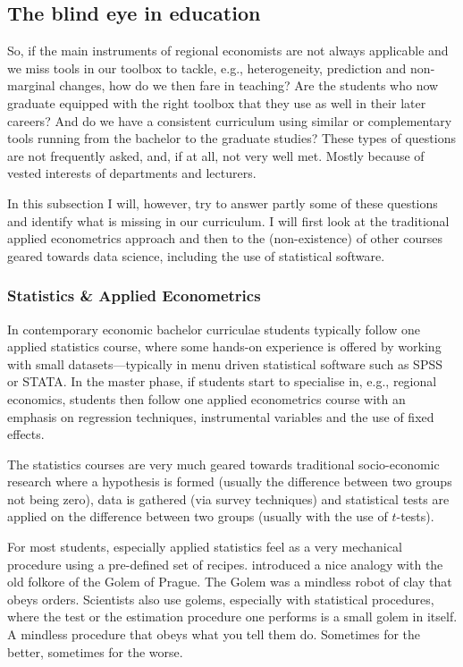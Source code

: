 \documentclass[fleqn,10pt]{SelfArx} %
\begin{document}
\subsection{The blind eye in education}

So, if the main instruments of regional economists are not always applicable and
we miss tools in our toolbox to tackle, e.g., heterogeneity, prediction and
non-marginal changes, how do we then fare in teaching? Are the students who now
graduate equipped with the right toolbox that they use as well in their later
careers? And do we have a consistent curriculum using similar or complementary
tools running from the bachelor to the graduate studies? These types of
questions are not frequently asked, and, if at all, not very well met. Mostly
because of vested interests of departments and lecturers.

In this subsection I will, however, try to answer partly some of these questions
and identify what is missing in our curriculum. I will first look at the
traditional applied econometrics approach and then to the (non-existence) of
other courses geared towards data science, including the use of statistical software.

\subsubsection{Statistics \& Applied Econometrics}

In contemporary economic bachelor curriculae students typically follow one
applied statistics course, where some hands-on experience is offered by working
with small datasets---typically in menu driven statistical software such as SPSS
or STATA. In the master phase, if students start to specialise in, e.g.,
regional economics, students then follow one applied econometrics
course with an emphasis on regression techniques, instrumental variables and the
use of fixed effects.

The statistics courses are very much geared towards traditional socio-economic
research where a hypothesis is formed (usually the difference between two groups
not being zero), data is gathered (via survey techniques) and statistical tests
are applied on the difference between two groups (usually with the use of
$t$-tests).

For most students, especially applied statistics feel as a very mechanical
procedure using a pre-defined set of recipes. \citet{mcelreath2016statistical}
introduced a nice analogy with the old folkore of the Golem of Prague. The
Golem was a mindless robot of clay that obeys orders. Scientists also use
golems, especially with statistical procedures, where the test or the estimation procedure one
performs is a small golem in itself. A mindless procedure that obeys what you
tell them do. Sometimes for the better, sometimes for the worse. 
\end{document}
